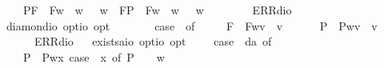 \begin{isabellebody}
\ \ \ \ {\isacharparenleft}P{\isacharparenleft}{\isasymalpha}{\isacharparenright}{\isacharcomma}F{\isacharparenleft}{\isasymbeta}{\isacharparenright}{\isacharparenright}\ {\isasymRightarrow}\ F{\isacharparenleft}{\isasymlambda}w{\isachardot}\ {\isasymalpha}\ w\ {\isasymlongleftrightarrow}\ {\isasymbeta}\ w{\isacharparenright}\ {\isacharbar}\ {\isacharparenleft}F{\isacharparenleft}{\isasymalpha}{\isacharparenright}{\isacharcomma}P{\isacharparenleft}{\isasymbeta}{\isacharparenright}{\isacharparenright}\ {\isasymRightarrow}\ F{\isacharparenleft}{\isasymlambda}w{\isachardot}\ {\isasymalpha}\ w\ {\isasymlongleftrightarrow}\ {\isasymbeta}\ w{\isacharparenright}\ {\isacharbar}\ \isanewline
\ \ \ \ {\isacharunderscore}\ {\isasymRightarrow}\ ERR{\isacharparenleft}dio{\isacharparenright}{\isachardoublequoteclose}\ \ \isanewline
\isanewline
\ \isamarkupfalse%
\ diamond{\isacharcolon}{\isacharcolon}{\isachardoublequoteopen}io\ opt{\isasymRightarrow}io\ opt{\isachardoublequoteclose}\ {\isacharparenleft}{\isachardoublequoteopen}\isactrlbold {\isasymdiamond}\ {\isacharunderscore}{\isachardoublequoteclose}\ {\isacharbrackleft}{}{}{\isacharbrackright}\ {}{}{\isacharparenright}\ \ {\isachardoublequoteopen}\isactrlbold {\isasymdiamond}{\isasymphi}\ {\isasymequiv}\ case\ {\isasymphi}\ of\ \isanewline
\ \ \ \ F{\isacharparenleft}{\isasympsi}{\isacharparenright}\ {\isasymRightarrow}\ F{\isacharparenleft}{\isasymlambda}w{\isachardot}{\isasymexists}v{\isachardot}\ {\isasympsi}\ v{\isacharparenright}\ {\isacharbar}\ \isanewline
\ \ \ \ P{\isacharparenleft}{\isasympsi}{\isacharparenright}\ {\isasymRightarrow}\ P{\isacharparenleft}{\isasymlambda}w{\isachardot}{\isasymexists}v{\isachardot}\ {\isasympsi}\ v{\isacharparenright}\ {\isacharbar}\ \isanewline
\ \ \ \ {\isacharunderscore}\ {\isasymRightarrow}\ ERR{\isacharparenleft}dio{\isacharparenright}{\isachardoublequoteclose}\isanewline
\isanewline
\ \isamarkupfalse%
\ exists{\isacharcolon}{\isacharcolon}{\isachardoublequoteopen}{\isacharparenleft}{\isacharprime}a{\isasymRightarrow}io\ opt{\isacharparenright}{\isasymRightarrow}io\ opt{\isachardoublequoteclose}\ {\isacharparenleft}{\isachardoublequoteopen}\isactrlbold {\isasymexists}{\isachardoublequoteclose}{\isacharparenright}\ \ {\isachardoublequoteopen}\isactrlbold {\isasymexists}{\isasymPhi}\ {\isasymequiv}\ case\ {\isacharparenleft}{\isasymPhi}\ da{\isacharparenright}\ of\isanewline
\ \ \ \ P{\isacharparenleft}{\isacharunderscore}{\isacharparenright}\ {\isasymRightarrow}\ P{\isacharparenleft}{\isasymlambda}w{\isachardot}{\isasymexists}x{\isachardot}\ case\ {\isacharparenleft}{\isasymPhi}\ x{\isacharparenright}\ of\ P\ {\isasympsi}\ {\isasymRightarrow}\ {\isasympsi}\ w{\isacharparenright}\ {\isacharbar}\ \isanewline

\end{isabellebody}
